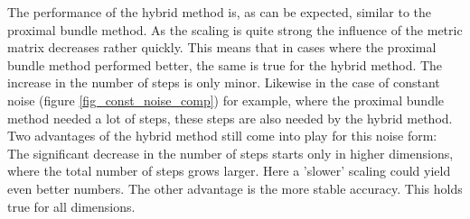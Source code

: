 The performance of the hybrid method is, as can be expected, similar to the proximal bundle method. As the scaling is quite strong the influence of the metric matrix decreases rather quickly.
This means that in cases where the proximal bundle method performed better, the same is true for the hybrid method. The increase in the number of steps is only minor. Likewise in the case of constant noise (figure \ref{fig_const_noise_comp}) for example, where the proximal bundle method needed a lot of steps, these steps are also needed by the hybrid method. Two advantages of the hybrid method still come into play for this noise form: The significant decrease in the number of steps starts only in higher dimensions, where the total number of steps grows larger. Here a 'slower' scaling could yield even better numbers.
The other advantage is the more stable accuracy. This holds true for all dimensions.
%
%
%
